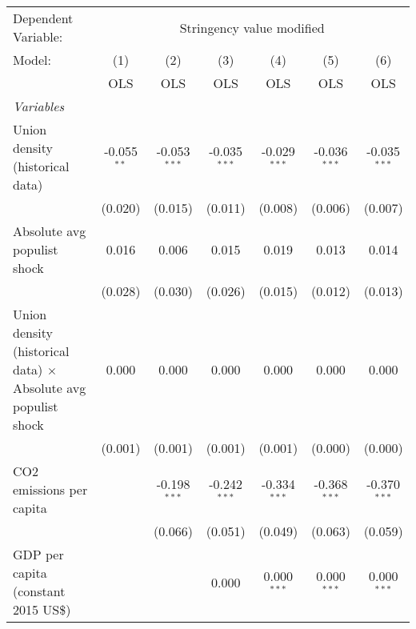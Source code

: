 
\begingroup
\centering
\begin{tabular}{lcccccc}
   \toprule
   Dependent Variable: & \multicolumn{6}{c}{Stringency value modified}\\
   Model:                                                                & (1)           & (2)            & (3)            & (4)            & (5)            & (6)\\  
                                                                         &  OLS          & OLS            & OLS            & OLS            & OLS            & OLS\\  
   \midrule
   \emph{Variables}\\
   Union density (historical data)                                       & -0.055$^{**}$ & -0.053$^{***}$ & -0.035$^{***}$ & -0.029$^{***}$ & -0.036$^{***}$ & -0.035$^{***}$\\   
                                                                         & (0.020)       & (0.015)        & (0.011)        & (0.008)        & (0.006)        & (0.007)\\   
   Absolute avg populist shock                                           & 0.016         & 0.006          & 0.015          & 0.019          & 0.013          & 0.014\\   
                                                                         & (0.028)       & (0.030)        & (0.026)        & (0.015)        & (0.012)        & (0.013)\\   
   Union density (historical data) $\times$ Absolute avg populist shock  & 0.000         & 0.000          & 0.000          & 0.000          & 0.000          & 0.000\\   
                                                                         & (0.001)       & (0.001)        & (0.001)        & (0.001)        & (0.000)        & (0.000)\\   
   CO2 emissions per capita                                              &               & -0.198$^{***}$ & -0.242$^{***}$ & -0.334$^{***}$ & -0.368$^{***}$ & -0.370$^{***}$\\   
                                                                         &               & (0.066)        & (0.051)        & (0.049)        & (0.063)        & (0.059)\\   
   GDP per capita (constant 2015 US\$)                                   &               &                & 0.000          & 0.000$^{***}$  & 0.000$^{***}$  & 0.000$^{***}$\\   

\end{tabular}
